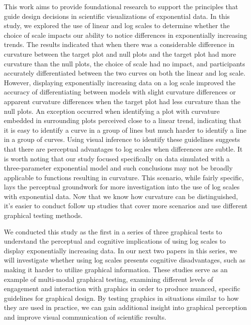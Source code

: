 \documentclass[12pt]{article}
\begin{document}
This work aims to provide foundational research to support the
principles that guide design decisions in scientific visualizations of
exponential data. In this study, we explored the use of linear and log
scales to determine whether the choice of scale impacts our ability to
notice differences in exponentially increasing trends. The results
indicated that when there was a considerable difference in curvature
between the target plot and null plots and the target plot had more
curvature than the null plots, the choice of scale had no impact, and
participants accurately differentiated between the two curves on both
the linear and log scale. However, displaying exponentially increasing
data on a log scale improved the accuracy of differentiating between
models with slight curvature differences or apparent curvature
differences when the target plot had less curvature than the null plots.
An exception occurred when identifying a plot with curvature embedded in
surrounding plots perceived close to a linear trend, indicating that it
is easy to identify a curve in a group of lines but much harder to
identify a line in a group of curves. Using visual inference to identify
these guidelines suggests that there are perceptual advantages to log
scales when differences are subtle. It is worth noting that our study
focused specifically on data simulated with a three-parameter
exponential model and such conclusions may not be broadly applicable to
functions resulting in curvature. This scenario, while fairly specific,
lays the perceptual groundwork for more investigation into the use of
log scales with exponential data. Now that we know how curvature can be
distinguished, it's easier to conduct follow up studies that cover more
scenarios and use different graphical testing methods.

We conducted this study as the first in a series of three graphical
tests to understand the perceptual and cognitive implications of using
log scales to display exponentially increasing data. In our next two
papers in this series, we will investigate whether using log scales
presents cognitive disadvantages, such as making it harder to utilize
graphical information. These studies serve as an example of multi-modal
graphical testing, examining different levels of engagement and
interaction with graphics in order to produce nuanced, specific
guidelines for graphical design. By testing graphics in situations
similar to how they are used in practice, we can gain additional insight
into graphical perception and improve visual communication of scientific
results.
\end{document}
